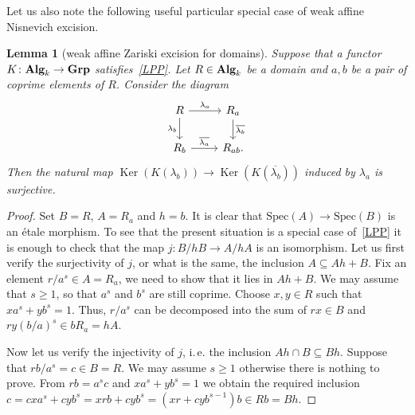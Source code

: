 \documentclass[oneside, 11pt]{amsart} \pdfoutput=1
\newcommand{\Ker}{\mathop{\mathrm{Ker}}\nolimits}
\numberwithin{equation}{section}
\newtheorem{lemma}{Lemma} \numberwithin{lemma}{section}
\theoremstyle{definition}
\newcommand{\catname}[1]{{\normalfont\textbf{#1}}} %
\begin{document}
Let us also note the following useful particular special case of weak affine Nisnevich excision.
\begin{lemma}[weak affine Zariski excision for domains]
	\label{zgl} Suppose that a functor $K\colon \catname{Alg}_k \to \catname{Grp}$ satisfies~\ref{LPP}. Let $R \in \catname{Alg}_k$ be a domain and $a, b$ be a pair of coprime elements of $R$. Consider the diagram
$$\begin{tikzcd}
	R \ar{r}{\lambda_a} \ar{d}[swap]{\lambda_b} & R_a \ar{d}{\overline{\lambda_b}}\\
	R_b \ar{r}{\overline{\lambda_a}} & R_{ab}.
\end{tikzcd}$$
	Then the natural map $\Ker(K(\lambda_b)) \to \Ker(K(\overline{\lambda_b}))$ induced by $\lambda_a$ is surjective.
\end{lemma}
\begin{proof}
	Set $B=R$, $A=R_a$ and $h=b$. It is clear that $\mathrm{Spec}(A)\to\mathrm{Spec}(B)$ is an {\'e}tale morphism. To see that the present situation is a special case of~\ref{LPP} it is enough to  check that the map $j\colon B/hB \to A/hA$ is an isomorphism. Let us first verify the surjectivity of $j$, or what is the same, the inclusion $A \subseteq Ah+B$. Fix an element $r/a^s\in A=R_a$, we need to show that it lies in $Ah+B$. We may assume that $s\geq 1$, so that $a^s$ and $b^s$ are still coprime. Choose $x, y \in R$ such that $xa^s+yb^s=1$. Thus, $r/a^s$ can be decomposed into the sum of $rx\in B$ and $ry(b/a)^s\in bR_a=hA$.

	Now let us verify the injectivity of $j$, i.\,e. the inclusion $Ah\cap B \subseteq Bh$. Suppose that $rb/a^s=c\in B=R$. We may assume $s\geq 1$ otherwise there is nothing to prove. From $rb=a^sc$ and $xa^s+yb^s=1$ we obtain the required inclusion $c=cxa^s+cyb^s=xrb+cyb^s=(xr+cyb^{s-1})b \in Rb = Bh$. 
\end{proof}
\end{document}
